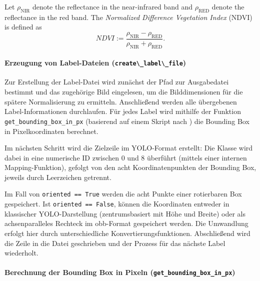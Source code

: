 \begin{definition}
Let $\rho_{\text{NIR}}$ denote the reflectance in the near-infrared band and 
$\rho_{\text{RED}}$ denote the reflectance in the red band. 
The \textit{Normalized Difference Vegetation Index} (NDVI) is defined as
\begin{equation}
NDVI := \frac{\rho_{\text{NIR}} - \rho_{\text{RED}}}{\rho_{\text{NIR}} + \rho_{\text{RED}}}.
\end{equation}
\label{def:ndvi}
\end{definition}



\paragraph{Erzeugung von Label-Dateien (\lstinline|create\_label\_file|)}
\hypertarget{par:create_label_file}{}

Zur Erstellung der Label-Datei wird zunächst der Pfad zur Ausgabedatei bestimmt und das zugehörige Bild eingelesen, um die Bilddimensionen für die spätere Normalisierung zu ermitteln. Anschließend werden alle übergebenen Label-Informationen durchlaufen. Für jedes Label wird mithilfe der Funktion \lstinline|get_bounding_box_in_px| (basierend auf einem Skript nach \citeauthor{Razakarivony2015}) die Bounding Box in Pixelkoordinaten berechnet.

Im nächsten Schritt wird die Zielzeile im \acrshort{YOLO}-Format erstellt: Die Klasse wird dabei in eine numerische \acrshort{ID} zwischen 0 und 8 überführt (mittels einer internen Mapping-Funktion), gefolgt von den acht Koordinatenpunkten der Bounding Box, jeweils durch Leerzeichen getrennt.

Im Fall von \lstinline|oriented == True| werden die acht Punkte einer rotierbaren Box gespeichert. Ist \lstinline|oriented == False|, können die Koordinaten entweder in klassischer \acrshort{YOLO}-Darstellung (zentrumsbasiert mit Höhe und Breite) oder als achsenparalleles Rechteck im \acrshort{obb}-Format gespeichert werden. Die Umwandlung erfolgt hier durch unterschiedliche Konvertierungsfunktionen. Abschließend wird die Zeile in die Datei geschrieben und der Prozess für das nächste Label wiederholt.

\paragraph{Berechnung der Bounding Box in Pixeln (\lstinline|get_bounding_box_in_px|)}

